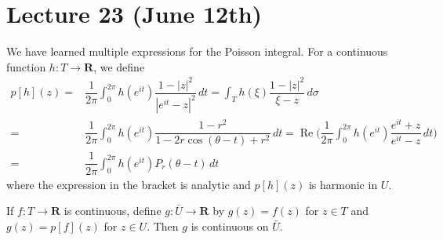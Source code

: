 \section{Lecture 23 (June 12th)}
\begin{recall}
We have learned multiple expressions for the Poisson integral. For a continuous function $h:T\rightarrow {\bm R}$, we define
\begin{align*}
p[h](z)=&\dfrac{1}{2\pi }\int ^{2\pi }_{0}h(e^{it})\dfrac{1-|z|^2}{|e^{it}-z|^2}\,dt=\int _{T}h(\xi )\dfrac{1-|z|^2}{\xi -z}\,d\sigma \\
=&\dfrac{1}{2\pi }\int ^{2\pi }_{0}h(e^{it})\dfrac{1-r^2}{1-2r\cos (\theta -t)+r^2}\,dt=\mathop{\mathrm{Re}}\Big(\dfrac{1}{2\pi }\int ^{2\pi }_{0}h(e^{it})\dfrac{e^{it}+z}{e^{it}-z}\,dt\Big)\\
=&\dfrac{1}{2\pi }\int ^{2\pi }_{0}h(e^{it})P_{r}(\theta -t)\,dt
\end{align*}
where the expression in the bracket is analytic and $p[h](z)$ is harmonic in $U$.
\end{recall}
\vspace{2ex}
\begin{thm}
If $f:T\rightarrow {\bm R}$ is continuous, define $g:\bar{U}\rightarrow {\bm R}$ by $g(z)=f(z)$ for $z\in T$ and $g(z)=p[f](z)$ for $z\in U$. Then $g$ is continuous on $\bar{U}$. 
\end{thm}
\vspace{2ex}
